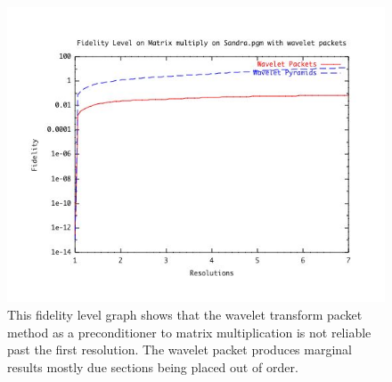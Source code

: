 \begin{figure}[ht]
\includegraphics [width=6.5in]{sandrapyrpackresults.jpg}
\caption{This fidelity level graph shows that the wavelet transform packet method as a preconditioner to matrix multiplication is not reliable past the first resolution. The wavelet packet produces marginal results mostly due sections being placed out of order.}
\label{packetresultsstraight}
\end{figure}

